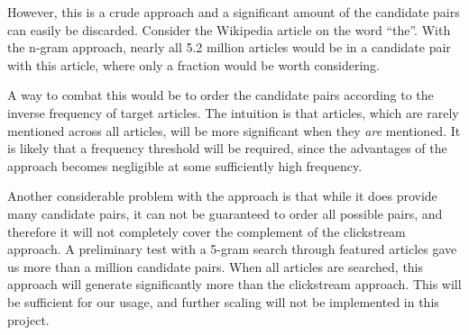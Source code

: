 However, this is a crude approach and a significant amount of the candidate pairs can easily be discarded. Consider the Wikipedia article on the word \enquote{the}. With the n-gram approach, nearly all 5.2 million articles would be in a candidate pair with this article, where only a fraction would be worth considering.

A way to combat this would be to order the candidate pairs according to the inverse frequency of target articles. The intuition is that articles, which are rarely mentioned across all articles, will be more significant when they \emph{are} mentioned. It is likely that a frequency threshold will be required, since the advantages of the approach becomes negligible at some sufficiently high frequency.

Another considerable problem with the approach is that while it does provide many candidate pairs, it can not be guaranteed to order all possible pairs, and therefore it will not completely cover the complement of the clickstream approach. A preliminary test with a 5-gram search through featured articles gave us more than a million candidate pairs. When all articles are searched, this approach will generate significantly more than the clickstream approach. This will be sufficient for our usage, and further scaling will not be implemented in this project.


